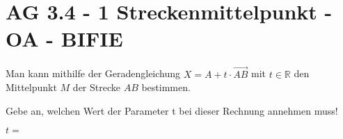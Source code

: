 \section{AG 3.4 - 1 Streckenmittelpunkt - OA - BIFIE}

\begin{beispiel}[AG 3.4]{1} %
			Man kann mithilfe der Geradengleichung $X=A+t\cdot \overrightarrow{AB}$ mit $t\in \mathbb{R}$ den Mittelpunkt $M$ der Strecke $AB$ bestimmen.
	
	Gebe an, welchen Wert der Parameter t bei dieser Rechnung annehmen muss!
	\leer
	
	$t=$ 
\end{beispiel}